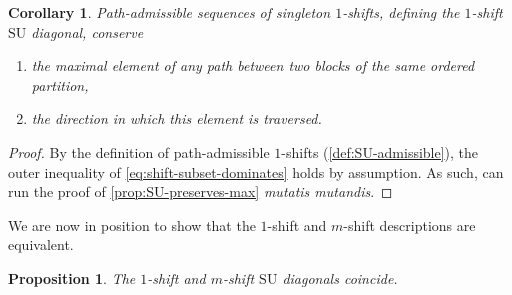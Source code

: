 \documentclass{amsart}
\newtheorem{corollary}[theorem]{Corollary}
\newtheorem{proposition}[theorem]{Proposition}
\theoremstyle{definition}
\newcommand{\SU}{\mathrm{SU}}
\begin{document}
\begin{corollary} 
\label{cor:SU-1-shift-preserves-max}
Path-admissible sequences of singleton $1$-shifts, defining the $1$-shift $\SU$ diagonal, conserve 
\begin{enumerate}
\item the maximal element of any path between two blocks of the same ordered partition,
\item the direction in which this element is traversed. 
\end{enumerate}
\end{corollary}

\begin{proof}
By the definition of path-admissible $1$-shifts (\cref{def:SU-admissible}), the outer inequality of \cref{eq:shift-subset-dominates} holds by assumption.
As such, can run the proof of \cref{prop:SU-preserves-max} \emph{mutatis mutandis}.
\end{proof}

We are now in position to show that the $1$-shift and $m$-shift descriptions are equivalent. 


\begin{proposition}
\label{prop:iso-1-to-m-shift}
The $1$-shift and $m$-shift $\SU$ diagonals coincide.
\end{proposition}
\end{document}
